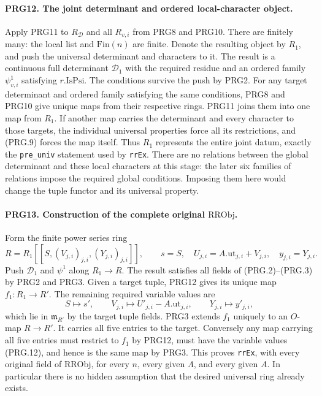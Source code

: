 \paragraph{PRG12. The joint determinant and ordered local-character object.}
\label{claim:PRG12}
Apply PRG11 to \(R_{\mathcal D}\) and all \(R_{v,i}\) from
PRG8 and PRG10. There are finitely many: the local list and
\(\mathrm{Fin}(n)\) are finite. Denote the resulting object by
\(R_1\), and push the universal determinant and characters to it.
The result is a continuous full determinant \(\mathcal D_1\)
with the required residue and an ordered family \(\psi^1_{v,i}\)
satisfying \(r.\mathrm{IsPsi}\). The conditions survive the push
by PRG2. For any target determinant and ordered family satisfying
the same conditions, PRG8 and PRG10 give unique maps from their
respective rings. PRG11 joins them into one map from \(R_1\).
If another map carries the determinant and every character to
those targets, the individual universal properties force all its
restrictions, and (PRG.9) forces the map itself. Thus
\(R_1\) represents the entire joint datum, exactly the
\texttt{pre\_univ} statement used by \texttt{rrEx}.
There are no relations between the global determinant and these
local characters at this stage: the later six families of
relations impose the required global conditions. Imposing them
here would change the tuple functor and its universal property.

\paragraph{PRG13. Construction of the complete original \(\mathrm{RRObj}\).}
\label{claim:PRG13}
Form the finite power series ring
\[
 R=R_1[[S,(V_{j,i})_{j,i},(Y_{j,i})_{j,i}]],\qquad
 s=S,\quad U_{j,i}=A.\mathrm{ut}_{j,i}+V_{j,i},\quad
 y_{j,i}=Y_{j,i}.                                          \tag{PRG.11}
\]
Push \(\mathcal D_1\) and \(\psi^1\) along \(R_1\to R\).
The result satisfies all fields of (PRG.2)--(PRG.3) by PRG2 and
PRG3. Given a target tuple, PRG12 gives its unique map
\(f_1:R_1\to R'\). The remaining required variable values are
\[
 S\mapsto s',\qquad V_{j,i}\mapsto U'_{j,i}-A.\mathrm{ut}_{j,i},
 \qquad Y_{j,i}\mapsto y'_{j,i},                            \tag{PRG.12}
\]
which lie in \(\mathfrak m_{R'}\) by the target tuple fields.
PRG3 extends \(f_1\) uniquely to an \(O\)-map \(R\to R'\).
It carries all five entries to the target. Conversely any map
carrying all five entries must restrict to \(f_1\) by PRG12,
must have the variable values (PRG.12), and hence is the same map
by PRG3. This proves \texttt{rrEx}, with every original field of
\(\mathrm{RRObj}\), for every \(n\), every given \(\Lambda\),
and every given \(A\). In particular there is no hidden
assumption that the desired universal ring already exists.

